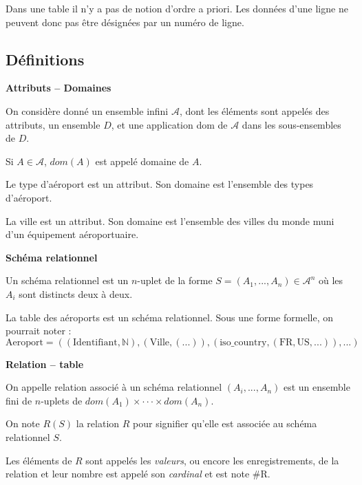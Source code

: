 \documentclass[10pt]{article}
\begin{document}
\begin{rem}
Dans une table il n'y a pas de notion d'ordre a priori. Les données d'une ligne ne peuvent donc pas être désignées par un numéro de ligne.
\end{rem}

\subsection{Définitions \cite{2}}

\begin{defi}
\textbf{Attributs -- Domaines}

On considère donné un ensemble infini $\mathcal{A}$, dont les éléments sont appelés des attributs, un ensemble $D$, et une application dom de $\mathcal{A}$ dans les sous-ensembles de $D$. 

Si $A\in \mathcal{A}$, $dom(A)$ est appelé domaine de $A$.

\end{defi}

\begin{exemple}
Le type d'aéroport est un attribut. Son domaine est l'ensemble des types d'aéroport. 

La ville est un attribut. Son domaine est l'ensemble des villes du monde muni d'un équipement aéroportuaire. 

\end{exemple}

\begin{defi}
\textbf{Schéma relationnel}

Un schéma relationnel est un $n$-uplet de la forme $S=(A_1,...,A_n) \in \mathcal{A}^n$ où les $A_i$ sont distincts deux à deux. 
\end{defi}

\begin{exemple}
La table des aéroports est un schéma relationnel. 
Sous une forme formelle, on pourrait noter :
$$ \text{Aeroport} = \left(\left( \text{Identifiant}, \mathbb{N}\right),\left(\text{Ville}, \left( ...\right)\right), \left(\text{iso\_country},\left(\text{FR},\text{US},... \right)  \right),... \right)$$
\end{exemple}

\begin{defi}
\textbf{Relation -- table}

On appelle relation associé à un schéma relationnel $\left(A_i,...,A_n \right)$ est un ensemble fini de $n$-uplets de $dom(A_1)\times \cdot\cdot\cdot \times dom(A_n)$.

On note $R(S)$ la relation $R$ pour signifier qu'elle est associée au schéma relationnel $S$. 

Les éléments de $R$ sont appelés les \textit{valeurs}, ou encore les enregistrements, de la relation et leur nombre est appelé son \textit{cardinal} et est note \#R.
\end{defi}
\end{document}
